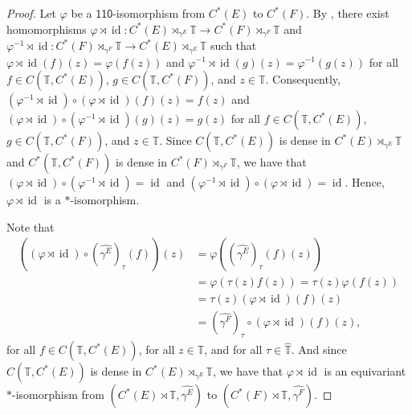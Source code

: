 \documentclass[12pt]{amsbook}%
\renewcommand{\phi}{\varphi}
\theoremstyle{defin}
\theoremstyle{remark}
\numberwithin{equation}{chapter}
\numberwithin{theor}{section}
\newcommand{\TT}{\mathbb{T}}
\newcommand{\xyz}[1]{\mbox{$\mathsf{#1}$}}
\newcommand{\id}{\operatorname{id}}
\begin{document}
\begin{proof}
Let $\phi$ be a \xyz{110}-isomorphism from $C^*(E)$ to $C^*(F)$.  By \cite[Corollary~2.4.8]{dpw:cpc}, there exist homomorphisms $ \phi \rtimes \id \colon C^*(E) \rtimes_{\gamma^E} \TT \to C^*(F) \rtimes_{ \gamma^F } \TT$ and $\phi^{-1} \rtimes \id \colon C^*(F) \rtimes_{\gamma^F} \TT \to C^*(E) \rtimes_{\gamma^E } \TT$ such that $\phi \rtimes \id ( f )(z) = \phi ( f(z) )$ and $\phi^{-1} \rtimes \id ( g)(z) = \phi^{-1} ( g(z) )$ for all $f \in C( \TT, C^*(E) )$, $g \in C(\TT, C^*(F))$, and $z \in \TT$.  Consequently, $(\phi^{-1} \rtimes \id) \circ ( \phi \rtimes \id )(f) (z) = f(z)$ and $(\phi \rtimes \id ) \circ ( \phi^{-1} \rtimes \id )( g)(z) = g(z)$ for all $f \in C( \TT, C^*(E) )$, $g \in C(\TT, C^*(F))$, and $z \in \TT$.  Since $C(\TT, C^*(E))$ is dense in $C^*(E) \rtimes_{\gamma^E} \TT$ and $C^*(\TT, C^*(F))$ is dense in $C^*(F) \rtimes_{\gamma^F} \TT$, we have that $(\phi \rtimes \id ) \circ ( \phi^{-1} \rtimes \id ) = \id$ and $( \phi^{-1} \rtimes \id ) \circ ( \phi \rtimes \id ) = \id$.  Hence, $\phi \rtimes \id$ is a $*$-isomorphism.

Note that 
\begin{align*}
( ( \phi \rtimes \id ) \circ (\widehat{\gamma^E})_\tau (f) )(z) &= \phi ( (\widehat{\gamma^E})_\tau ( f )(z)) \\
							&= \phi ( \tau (z)  f(z) ) = \tau (z) \phi ( f(z) ) \\
							&=  \tau (z) (\phi \rtimes \id)(f)(z) \\
							&= (\widehat{\gamma^F})_\tau \circ (\phi \rtimes \id )( f)(z),
\end{align*}
for all $f \in C( \TT , C^*(E))$, for all $z\in \TT$, and for all $\tau \in \widehat{\TT}$.  And since $C( \TT, C^*(E))$ is dense in $C^*(E) \rtimes_{\gamma^E} \TT$, we have that $\phi \rtimes \id$ is an equivariant $*$-isomorphism from $( C^*(E) \rtimes \TT, \widehat{\gamma^E} )$ to $(C^*(F) \rtimes \TT, \widehat{\gamma^F})$.


\end{proof}
\end{document}
